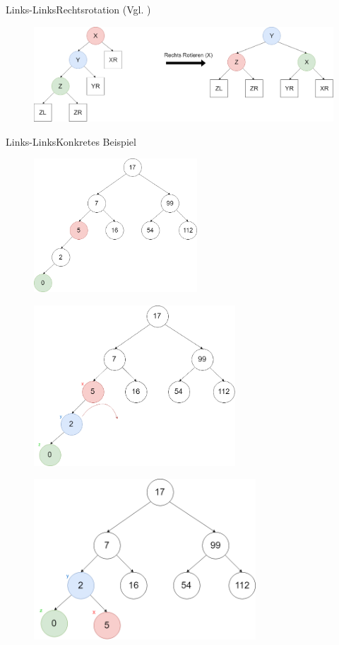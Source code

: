 \begin{frame}{Links-Links}{Rechtsrotation (Vgl. \cite{avltree})}
\begin{figure}
	\centering
	\includegraphics[width=\textwidth]{graph/avl_insert_ll}
\end{figure}
\end{frame}

\begin{frame}[allowframebreaks]{Links-Links}{Konkretes Beispiel}
\begin{figure}[ht!]
	\centering
	\includegraphics[height=5cm]{graph/avl_insert_ll_1}
\end{figure}
\framebreak
\begin{figure}
	\centering
	\includegraphics[height=6cm]{graph/avl_insert_ll_2}
\end{figure}
\framebreak
\begin{figure}
	\centering
	\includegraphics[height=6cm]{graph/avl_insert_ll_3}
\end{figure}

\end{frame}

